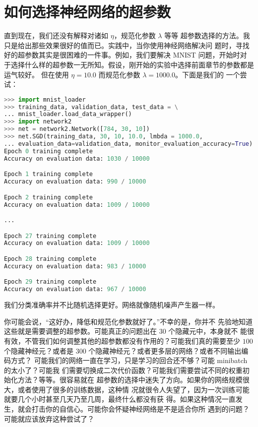 \section{如何选择神经网络的超参数}
\label{sec:how_to_choose_a_neural_network's_hyper-parameters}

直到现在，我们还没有解释对诸如\learningrate{} $\eta$，规范化参数 $\lambda$ 等等
超参数选择的方法。我只是给出那些效果很好的值而已。实践中，当你使用神经网络解决问
题时，寻找好的超参数其实是很困难的一件事。例如，我们要解决 MNIST 问题，开始时对
于选择什么样的超参数一无所知。假设，刚开始的实验中选择前面章节的参数都是运气较好。
但在使用\learningrate{} $\eta=10.0$ 而规范化参数 $\lambda=1000.0$。下面是我们的
一个尝试：

\begin{lstlisting}[language=Python]
>>> import mnist_loader
>>> training_data, validation_data, test_data = \
... mnist_loader.load_data_wrapper()
>>> import network2
>>> net = network2.Network([784, 30, 10])
>>> net.SGD(training_data, 30, 10, 10.0, lmbda = 1000.0,
... evaluation_data=validation_data, monitor_evaluation_accuracy=True)
Epoch 0 training complete
Accuracy on evaluation data: 1030 / 10000

Epoch 1 training complete
Accuracy on evaluation data: 990 / 10000

Epoch 2 training complete
Accuracy on evaluation data: 1009 / 10000

...

Epoch 27 training complete
Accuracy on evaluation data: 1009 / 10000

Epoch 28 training complete
Accuracy on evaluation data: 983 / 10000

Epoch 29 training complete
Accuracy on evaluation data: 967 / 10000
\end{lstlisting}

我们分类准确率并不比随机选择更好。网络就像随机噪声产生器一样。

你可能会说，“这好办，降低\learningrate{}和规范化参数就好了。”不幸的是，你并不
先验地知道这些就是需要调整的超参数。可能真正的问题出在 $30$ 个隐藏元中，本身就不
能很有效，不管我们如何调整其他的超参数都没有作用的？可能我们真的需要至少 $100$
个隐藏神经元？或者是 $300$ 个隐藏神经元？或者更多层的网络？或者不同输出编码方式？
可能我们的网络一直在学习，只是学习的回合还不够？可能 minibatch 的太小了？可能我
们需要切换成二次代价函数？可能我们需要尝试不同的权重初始化方法？等等。很容易就在
超参数的选择中迷失了方向。如果你的网络规模很大，或者使用了很多的训练数据，这种情
况就很令人失望了，因为一次训练可能就要几个小时甚至几天乃至几周，最终什么都没有获
得。如果这种情况一直发生，就会打击你的自信心。可能你会怀疑神经网络是不是适合你所
遇到的问题？可能就应该放弃这种尝试了？

